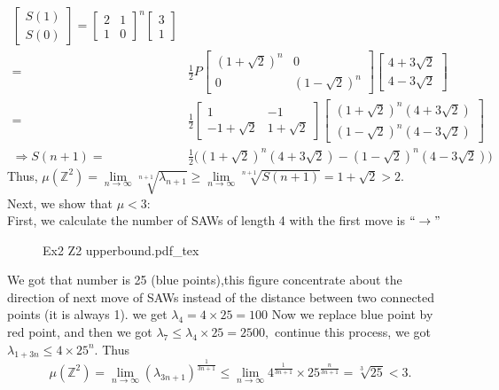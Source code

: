 \documentclass[12pt,a4paper]{article}
\newcommand{\incfig}[1]{%
{#1.pdf_tex}
}
\begin{document}
\begin{enumerate}
\begin{enumerate}
\begin{align*}
\begin{bmatrix}
	    S(1)\\
	    S(0)
	    \end{bmatrix}=\begin{bmatrix}
	    2 & 1\\
	    1 & 0
	    \end{bmatrix}^n\begin{bmatrix}
	    3\\
	    1
	    \end{bmatrix}\\
	    =& \frac{1}{2}P\begin{bmatrix}
	    (1+\sqrt{2})^n & 0\\
	    0 & (1-\sqrt{2})^n
	    \end{bmatrix}\begin{bmatrix}
	    4+3\sqrt{2}\\
	    4-3\sqrt{2}
	    \end{bmatrix}\\
	    =& \frac{1}{2}\begin{bmatrix}
	    1 & -1\\
	    -1+\sqrt{2} & 1+\sqrt{2}
	    \end{bmatrix}\begin{bmatrix}
	    (1+\sqrt{2})^n(4+3\sqrt{2})\\
	    (1-\sqrt{2})^n(4-3\sqrt{2})
	    \end{bmatrix}\\
	    \Rightarrow S(n+1)=& \frac{1}{2}\Big((1+\sqrt{2})^n(4+3\sqrt{2})-(1-\sqrt{2})^n(4-3\sqrt{2})\Big)
	    \end{align*}
	    Thus, $\mu(\mathbb{Z}^2)=\lim\limits_{n\to\infty}\sqrt[n+1]{\lambda_{n+1}}\geq \lim\limits_{n\to\infty}\sqrt[n+1]{S(n+1)}=1+\sqrt{2}>2.$\\[5pt]
	    Next, we show that $\mu<3:$\\
	    First, we calculate the number of SAWs of length 4 with the first move is $``\rightarrow"$
	    \newpage
		\begin{figure}[htp]
		\centering
		\def\svgwidth{8cm}
		\incfig{Ex2 Z2 upperbound}
		\end{figure}
		We got that number is 25 (blue points),this figure concentrate about the direction of next move of SAWs instead of the distance between two connected points (it is always 1). we get $\lambda_{4}=4\times 25=100$ Now we replace blue point by red point, and then we got $\lambda_7\leq \lambda_4\times 25=2500,$ continue this process, we got $\lambda_{1+3n}\leq 4\times 25^n.$ Thus 
		\[
		\mu(\mathbb{Z}^2)=\lim_{n\to\infty}(\lambda_{3n+1})^{\frac{1}{3n+1}}\leq \lim_{n\to\infty}4^{\frac{1}{3n+1}}\times 25^{\frac{n}{3n+1}}=\sqrt[3]{25}<3.
\]
\end{enumerate}
\end{enumerate}
\end{document}
